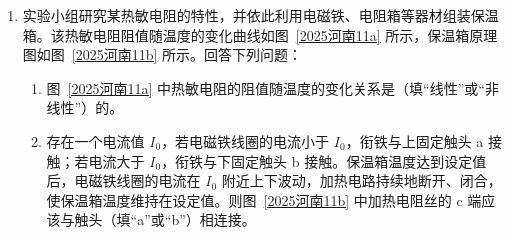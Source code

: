 \documentclass[\gkver]{gaokaozhenti}
\begin{document}
\begin{enumerate}

{固定 M、N，若两侧气体同时缓慢升高相同温度，P 将左移}
{保持 $T_{1}$、$T_{2}$ 不变，若 M、N 同时缓慢向中间移动相同距离，P 将右移}
{保持 $T_{1}$、$T_{2}$ 不变，若 M、N 同时缓慢向中间移动相同距离，P 将左移}


\item
实验小组研究某热敏电阻的特性，并依此利用电磁铁、电阻箱等器材组装保温箱。该热敏电阻阻值随温度的变化曲线如图~\ref{2025河南11a} 所示，保温箱原理图如图~\ref{2025河南11b} 所示。回答下列问题：

\begin{enumerate}
	\item
	图~\ref{2025河南11a} 中热敏电阻的阻值随温度的变化关系是（填“线性”或“非线性”）的。

	\item
	存在一个电流值 $I_{0}$，若电磁铁线圈的电流小于 $I_{0}$，衔铁与上固定触头 a 接触；若电流大于 $I_{0}$，衔铁与下固定触头 b 接触。保温箱温度达到设定值后，电磁铁线圈的电流在 $I_{0}$ 附近上下波动，加热电路持续地断开、闭合，使保温箱温度维持在设定值。则图~\ref{2025河南11b} 中加热电阻丝的 c 端应该与触头（填“a”或“b”）相连接。


\end{enumerate}
\end{enumerate}
\end{document}
